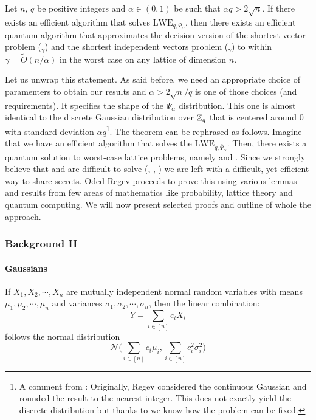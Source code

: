 \begin{theorem}\label{main}
	Let $n$, $q$ be positive integers and $\alpha \in (0, 1)$ be such that $\alpha q > 2 \sqrt{n}$. If there exists an efficient algorithm that solves $\text{LWE}_{q, \Psi_{\alpha}}$, then there exists an efficient quantum algorithm that approximates the decision version of the shortest vector problem ($_{\gamma}$) and the shortest independent vectors problem ($_{\gamma}$) to within $\gamma = \tilde{O}(n/\alpha)$ in the worst case on any lattice of dimension $n$.	
\end{theorem}

Let us unwrap this statement. As said before, we need an appropriate choice of paramenters to obtain our results and $\alpha > 2\sqrt{n}/q$ is one of those choices (and requirements). It specifies the shape of the $\Psi_{\alpha}$ distribution. This one is almost identical to the discrete Gaussian distribution over $\mathbb{Z}_q$ that is centered around 0 with standard deviation $\alpha q$\footnote{A comment from \cite{lattice-survey}: Originally, Regev considered the continuous Gaussian and rounded the result to the nearest integer. This does not exactly yield the discrete distribution but thanks to \cite{discr} we know how the problem can be fixed.}. The theorem can be rephrased as follows. Imagine that we have an efficient algorithm that solves the $\text{LWE}_{q, \bar{\Psi}_{\alpha}}$. Then, there exists a quantum solution to worst-case lattice problems, namely  and . Since we strongly believe that  and  are difficult to solve (\cite{svp-hard}, \cite{reductions}, \cite{cvp-hard}) we are left with a difficult, yet efficient way to share secrets. Oded Regev proceeds to prove this using various lemmas and results from few areas of mathematics like probability, lattice theory and quantum computing. We will now present selected proofs and outline of whole the approach.

\subsubsection{Background II}
\paragraph{Gaussians}
\begin{definition}
\end{definition}
\begin{definition}\label{smoothing}
\end{definition}
\begin{proposition}\label{gauss_sum}
If $X_1, X_2, \cdots, X_n$ are mutually independent normal random variables with means $\mu_1, \mu_2, \cdots, \mu_n$ and variances $\sigma_1, \sigma_2, \cdots, \sigma_n$, then the linear combination:
\[ Y = \sum_{i \in [n]} c_i X_i \]
follows the normal distribution
\[ \mathcal{N}\biggl(\sum_{i \in [n]} c_i \mu_i, \sum_{i \in [n]} c^2_i \sigma^2_i\biggr)  \]
\end{proposition}
